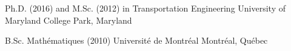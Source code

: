 

\begin{cventries}




    \cventry
    {Ph.D. (2016) and M.Sc. (2012) in Transportation Engineering} %
    {University of Maryland} %
    {College Park, Maryland} %
    {} %
    {}
  
  \cventry
    {B.Sc. Math\'ematiques (2010)} %
    {Universit\'e de Montr\'eal} %
    {Montr\'eal, Qu\'ebec} %
    {} %
    {}
\end{cventries}
